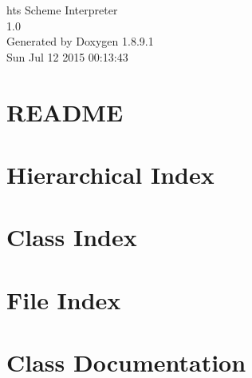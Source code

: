 \documentclass[twoside]{book}
\newcommand{\+}{\discretionary{\mbox{\scriptsize$\hookleftarrow$}}{}{}}
\newcommand{\clearemptydoublepage}{%
  \newpage{\pagestyle{empty}\cleardoublepage}%
}
\begin{document}
\hypersetup{pageanchor=false,
             bookmarks=true,
             bookmarksnumbered=true,
             pdfencoding=unicode
            }
\begin{titlepage}
\vspace*{7cm}
\begin{center}%
{\Large ht\textquotesingle{}s Scheme Interpreter \\[1ex]\large 1.\+0 }\\
\vspace*{1cm}
{\large Generated by Doxygen 1.8.9.1}\\
\vspace*{0.5cm}
{\small Sun Jul 12 2015 00:13:43}\\
\end{center}
\end{titlepage}
\clearemptydoublepage
\tableofcontents
\clearemptydoublepage
{}
\hypersetup{pageanchor=true}

\chapter{R\+E\+A\+D\+M\+E}
\label{md__r_e_a_d_m_e}
\hypertarget{md__r_e_a_d_m_e}{}

\chapter{Hierarchical Index}

\chapter{Class Index}

\chapter{File Index}

\chapter{Class Documentation}











\end{document}
